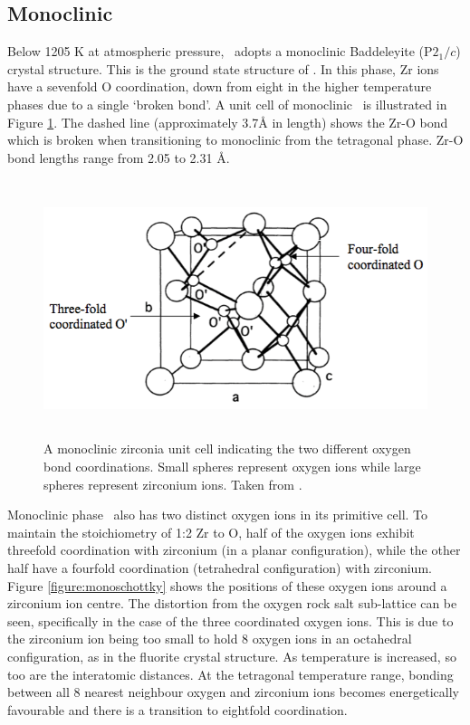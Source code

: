 \subsection{Monoclinic}

Below 1205 K at atmospheric pressure, \zirconia\ adopts a monoclinic Baddeleyite (P$2_{1}/c$) crystal structure. This is the ground state structure of \zirconia . In this phase, Zr ions have a sevenfold O coordination, down from eight in the higher temperature phases due to a single `broken bond'. A unit cell of monoclinic \zirconia\ is illustrated in Figure \ref{figure:coordination}. The dashed line (approximately 3.7\r{A} in length) shows the Zr-O bond which is broken when transitioning to monoclinic from the tetragonal phase. Zr-O bond lengths range from 2.05 to 2.31 \r{A}.

\begin{figure}[ht] %
\centering
\includegraphics[height=7.5cm]{images/coordination.png}
\caption[A monoclinic zirconia unit cell indicating the two different oxygen bond coordinations. Small spheres represent oxygen ions while large spheres represent zirconium ions.]{A monoclinic zirconia unit cell indicating the two different oxygen bond coordinations. Small spheres represent oxygen ions while large spheres represent zirconium ions. Taken from \cite{Xia2010}.
\label{figure:coordination}}
\end{figure}

Monoclinic phase \zirconia\ also has two distinct oxygen ions in its primitive cell. To maintain the stoichiometry of 1:2 Zr to O, half of the oxygen ions exhibit threefold coordination with zirconium (in a planar configuration), while the other half have a fourfold coordination (tetrahedral configuration) with zirconium. Figure \ref{figure:monoschottky} shows the positions of these oxygen ions around a zirconium ion centre. The distortion from the oxygen rock salt sub-lattice can be seen, specifically in the case of the three coordinated oxygen ions. This is due to the zirconium ion being too small to hold 8 oxygen ions in an octahedral configuration, as in the fluorite crystal structure. As temperature is increased, so too are the interatomic distances. At the tetragonal temperature range, bonding between all 8 nearest neighbour oxygen and zirconium ions becomes energetically favourable and there is a transition to eightfold coordination.

